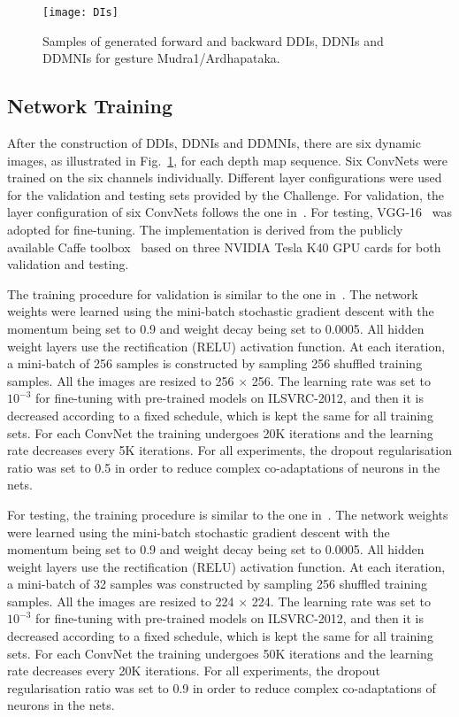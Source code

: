 \documentclass[10pt, a4paper, conference]{IEEEtran}
\begin{document}
\begin{figure}[t]
\begin{center}{\texttt{[image: DIs]}}
\end{center}
\caption{Samples of generated forward and backward DDIs, DDNIs and DDMNIs for gesture Mudra1/Ardhapataka.}
\label{fig:DIs}
\end{figure}


\subsection{Network Training}
After the construction of DDIs, DDNIs and DDMNIs, there are six dynamic images, as illustrated in Fig.~\ref{fig:DIs}, for each depth map sequence. Six ConvNets were trained on the six channels individually. Different layer configurations were used for the validation and testing sets provided by the Challenge. For validation, the layer configuration of six ConvNets follows the one in~\cite{krizhevsky2012imagenet}.  For testing, VGG-16~\cite{simonyan2014very} was adopted for fine-tuning. The implementation is derived from the publicly available Caffe toolbox~\cite{jia2014caffe} based on three {NVIDIA Tesla K40 GPU} cards for both validation and testing.

The training procedure for validation is similar to the one in~\cite{krizhevsky2012imagenet}. The network weights were learned using the mini-batch stochastic gradient descent with the momentum being set to 0.9 and weight decay being set to 0.0005. All hidden weight layers use the rectification (RELU) activation function. At each iteration, a mini-batch of 256 samples is constructed by sampling 256 shuffled training samples. All the images are resized to 256 $\times$ 256. The learning rate was set to $10^{-3}$ for fine-tuning with pre-trained models on ILSVRC-2012, and then it is decreased according to a fixed schedule, which is kept the same for all training sets. For each ConvNet the training undergoes 20K iterations and the learning rate decreases every 5K iterations. For all experiments, the dropout regularisation ratio was set to 0.5 in order to reduce complex co-adaptations of neurons in the nets.

For testing, the training procedure is similar to the one in~\cite{simonyan2014very}. The network weights were learned using the mini-batch stochastic gradient descent with the momentum being set to 0.9 and weight decay being set to 0.0005. All hidden weight layers use the rectification (RELU) activation function. At each iteration, a mini-batch of 32 samples was constructed by sampling 256 shuffled training samples. All the images are resized to 224 $\times$ 224. The learning rate was set to $10^{-3}$ for fine-tuning with pre-trained models on ILSVRC-2012, and then it is decreased according to a fixed schedule, which is kept the same for all training sets. For each ConvNet the training undergoes 50K iterations and the learning rate decreases every 20K iterations. For all experiments, the dropout regularisation ratio was set to 0.9 in order to reduce complex co-adaptations of neurons in the nets.
\end{document}
